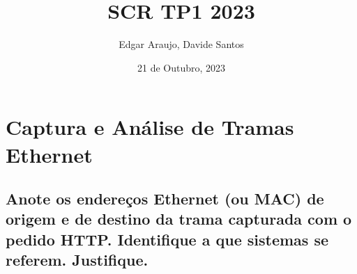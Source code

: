 \documentclass{article}
\title{SCR TP1 2023}
\author{Edgar Araujo, Davide Santos}
\date{21 de Outubro, 2023}
\begin{document}
\maketitle

\section{Captura e Análise de Tramas Ethernet}
\subsection{Anote os endereços Ethernet (ou MAC) de origem e de destino da trama
capturada com o pedido HTTP. Identifique a que sistemas se referem. Justifique.}
\end{document}
